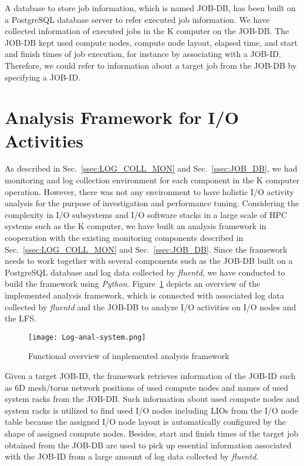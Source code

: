 \documentclass{jhps}
\begin{document}
A database to store job information, which is named JOB-DB,
has been built on a PostgreSQL database server to refer executed job information.
We have collected information of executed jobs in the K computer
on the JOB-DB.
The JOB-DB kept used compute nodes, compute node layout, elapsed time,
and start and finish times of job execution, for instance
by associating with a JOB-ID.
Therefore, we could refer to information about a target job
from the JOB-DB by specifying a JOB-ID.

\section{Analysis Framework for I/O Activities}
\label{sec:ANAL_SYS}

As described in Sec.~\ref{ssec:LOG_COLL_MON} and Sec.~\ref{ssec:JOB_DB},
we had monitoring and log collection environment for each component
in the K computer operation.
However, there was not any environment to have holistic I/O activity analysis
for the purpose of investigation and performance tuning.
Considering the complexity in I/O subsystems and I/O software stacks
in a large scale of HPC systems such as the K computer,
we have built an analysis framework in cooperation with
the existing monitoring components described in
Sec.~\ref{ssec:LOG_COLL_MON} and Sec.~\ref{ssec:JOB_DB}.
Since the framework needs to work together with several components
such as the JOB-DB built on a PostgreSQL database and log data
collected by {\itshape fluentd},
we have conducted to build the framework using {\itshape Python}.
Figure~\ref{fig:LOG_ANAL_SYS} depicts an overview of the implemented analysis framework,
which is connected with associated log data collected by {\itshape fluentd}
and the JOB-DB to analyze I/O activities on I/O nodes and the LFS.
%
\begin{figure}[tb]
\centering
\texttt{[image: Log-anal-system.png]}
\caption{Functional overview of implemented analysis framework}
\label{fig:LOG_ANAL_SYS}
\end{figure}
%
Given a target JOB-ID, the framework retrieves information of the JOB-ID
such as 6D mesh/torus network positions of used compute nodes and names of
used system racks from the JOB-DB.
Such information about used compute nodes and system racks is utilized
to find used I/O nodes including LIOs from the I/O node table
because the assigned I/O node layout is automatically configured
by the shape of assigned compute nodes.
Besides, start and finish times of the target job obtained from the JOB-DB
are used to pick up essential information associated with the JOB-ID
from a large amount of log data collected by {\itshape fluentd}.
\end{document}
